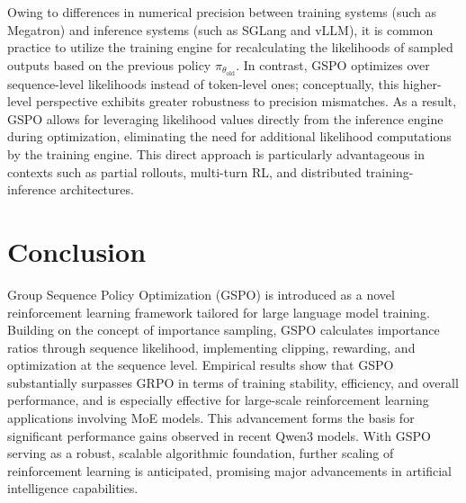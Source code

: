Owing to differences in numerical precision between training systems (such as Megatron) and inference systems (such as SGLang and vLLM), it is common practice to utilize the training engine for recalculating the likelihoods of sampled outputs based on the previous policy $\pi_{\theta_\text{old}}$. In contrast, GSPO optimizes over sequence-level likelihoods instead of token-level ones; conceptually, this higher-level perspective exhibits greater robustness to precision mismatches. As a result, GSPO allows for leveraging likelihood values directly from the inference engine during optimization, eliminating the need for additional likelihood computations by the training engine. This direct approach is particularly advantageous in contexts such as partial rollouts, multi-turn RL, and distributed training-inference architectures.

\section{Conclusion}

Group Sequence Policy Optimization (GSPO) is introduced as a novel reinforcement learning framework tailored for large language model training. Building on the concept of importance sampling, GSPO calculates importance ratios through sequence likelihood, implementing clipping, rewarding, and optimization at the sequence level. Empirical results show that GSPO substantially surpasses GRPO in terms of training stability, efficiency, and overall performance, and is especially effective for large-scale reinforcement learning applications involving MoE models. This advancement forms the basis for significant performance gains observed in recent Qwen3 models. With GSPO serving as a robust, scalable algorithmic foundation, further scaling of reinforcement learning is anticipated, promising major advancements in artificial intelligence capabilities.

